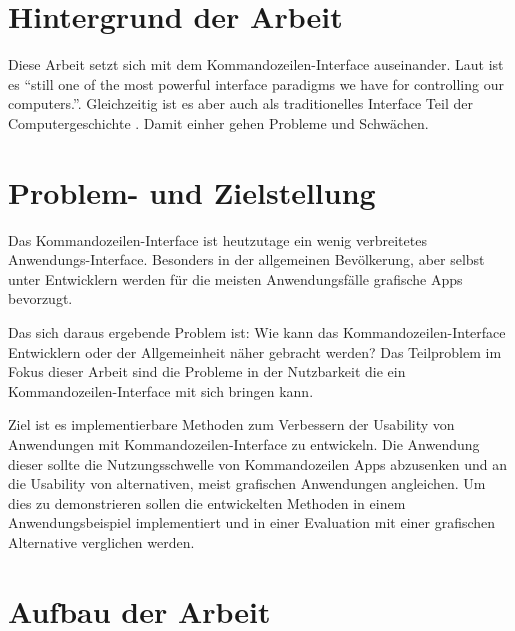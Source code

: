 \documentclass[oneside,bibliography=totocnumbered,BCOR=5mm]{scrbook}
\begin{document}
\section{Hintergrund der Arbeit}

Diese Arbeit setzt sich mit dem Kommandozeilen-Interface auseinander. Laut
\cite{Raskin_2008} ist es ``still one of the most powerful interface paradigms
we have for controlling our computers.''. Gleichzeitig ist es aber auch als
traditionelles Interface Teil der Computergeschichte \parencite{nielson1993}.
Damit einher gehen Probleme und Schwächen.

\section{Problem- und Zielstellung}

\label{sec:problem}

Das Kommandozeilen-Interface ist heutzutage ein wenig verbreitetes
Anwendungs-Interface. Besonders in der allgemeinen Bevölkerung, aber selbst
unter Entwicklern werden für die meisten Anwendungsfälle grafische Apps
bevorzugt.

Das sich daraus ergebende Problem ist: Wie kann das Kommandozeilen-Interface
Entwicklern oder der Allgemeinheit näher gebracht werden? Das Teilproblem
im Fokus dieser Arbeit sind die Probleme in der Nutzbarkeit die ein
Kommandozeilen-Interface mit sich bringen kann.

Ziel ist es implementierbare Methoden zum Verbessern der Usability von
Anwendungen mit Kommandozeilen-Interface zu entwickeln. Die Anwendung dieser
sollte die Nutzungsschwelle von Kommandozeilen Apps abzusenken und an die
Usability von alternativen, meist grafischen Anwendungen angleichen. Um dies
zu demonstrieren sollen die entwickelten Methoden in einem Anwendungsbeispiel
implementiert und in einer Evaluation mit einer grafischen Alternative
verglichen werden.

\newpage
\section{Aufbau der Arbeit}
\end{document}
